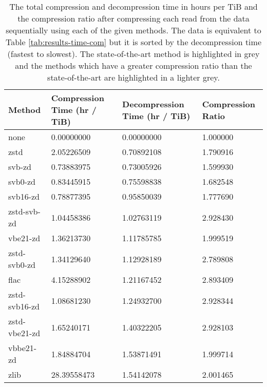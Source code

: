 \begin{table}
    \caption{\label{tab:results-time-dec} The total compression and
	decompression time in hours per TiB and the compression ratio after
	compressing each read from the data sequentially using each of the given
	methods. The data is equivalent to Table \ref{tab:results-time-com} but
	it is sorted by the decompression time (fastest to slowest). The state-of-the-art method is
	highlighted in grey and the methods which have a greater compression
	ratio than the state-of-the-art are highlighted in a lighter grey.}
	\begin{tabular}{|l|l|l|l|}
	    \hline
	    Method & Compression Time (hr / TiB) & Decompression Time (hr / TiB) & Compression Ratio \\
\hline
		none    & 0.00000000      & 0.00000000    &1.000000\\
               zstd     & 2.05226509      & 0.70892108    &1.790916\\
             svb-zd     & 0.73883975      & 0.73005926    &1.599930\\
            svb0-zd     & 0.83445915      & 0.75598838    &1.682548\\
           svb16-zd     & 0.78877395      & 0.95850039    &1.777690\\
		\rowcolor{gray}
        zstd-svb-zd     & 1.04458386      & 1.02763119    &2.928430\\
           vbe21-zd     & 1.36213730      & 1.11785785    &1.999519\\
       zstd-svb0-zd     & 1.34129640      & 1.12928189    &2.789808\\
               flac     & 4.15288902      & 1.21167452    &2.893409\\
      zstd-svb16-zd     & 1.08681230      & 1.24932700    &2.928344\\
      zstd-vbe21-zd     & 1.65240171      & 1.40322205    &2.928103\\
          vbbe21-zd     & 1.84884704      & 1.53871491    &1.999714\\
               zlib     &28.39558473      & 1.54142078    &2.001465\\

\end{tabular}
\end{table}
